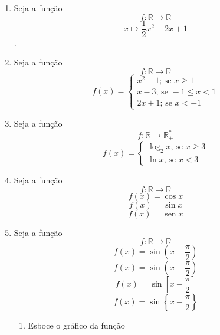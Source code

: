 \documentclass[a4paper, 12pt]{article}
\DeclareMathOperator{\sen}{sen} %
\begin{document}
\begin{enumerate}
    \item Seja a função 
    $$f : \mathbb{R} \to \mathbb{R}$$ %
    $$x \mapsto \dfrac{1}{2}x^2 - 2x + 1$$. %
    
    \item Seja a função
    $$f:\mathbb{R} \to \mathbb{R}$$
    $$f(x) = 
    \begin{cases} %
        
        x^2 - 1; \, \textrm{se } x \geq 1 \\ %
        x - 3; \, \textrm{se } -1 \leq x < 1 \\  
        2x + 1; \, \textrm{se } x < -1
        
    \end{cases}
    $$
  
    \item Seja a função
    $$f: \mathbb{R} \to \mathbb{R^*_+}$$
    $$f(x) = 
    \begin{cases}
        \log_2 x \textrm{, se } x \geq 3\\ %
        \ln x \textrm{, se } x < 3
    \end{cases}
    $$
    
    \item Seja a função
    $$f : \mathbb{R} \to \mathbb{R}$$
    $$f(x) = \cos x$$ %
    $$f(x) = \sin x$$
    $$f(x) = \sen x$$ %
    
    \item Seja a função
    $$f : \mathbb{R} \to \mathbb{R}$$
    $$f(x) = \sin (x - \frac{\pi}{2})$$ %
    $$f(x) = \sin \left(x - \frac{\pi}{2} \right)$$ %
    $$f(x) = \sin \left[x - \frac{\pi}{2} \right]$$ %
    $$f(x) = \sin \left\{x - \frac{\pi}{2} \right\}$$ %
    
    
    \begin{enumerate}
        \item Esboce o gráfico da função
    \end{enumerate}
    
\end{enumerate}
\end{document}
